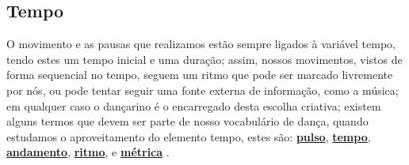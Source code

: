 \subsection{Tempo}
O movimento e as pausas que realizamos estão sempre ligados à variável tempo,
tendo estes um tempo inicial e uma duração;
assim, nossos movimentos, vistos de forma sequencial no tempo, 
seguem um ritmo que pode ser marcado livremente por nós,
ou pode tentar seguir uma fonte externa de informação, como a música;
em qualquer caso o dançarino é o encarregado desta escolha criativa;
existem alguns termos que devem ser parte de nosso vocabulário de dança,
quando estudamos o aproveitamento do elemento tempo,
estes são: 
\hyperref[ref:Pulso]{\textbf{pulso}}, 
\hyperref[sec:Tempo]{\textbf{tempo}}, 
\hyperref[sec:Andamento]{\textbf{andamento}}, 
\hyperref[sec:pos:Ritmo]{\textbf{ritmo}}, e 
\hyperref[def:Metrica]{\textbf{métrica}}
\cite[pp. 82]{schrader2005sense}
\cite[pp. 131, 134, 136]{mccutchen2006teaching}.

